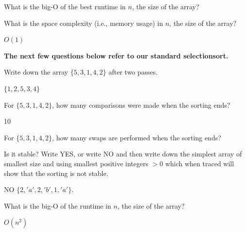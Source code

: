 \nextq
What is the big-O of the best runtime in $n$, the size of the array?
\\
\ANSWER
{}

\nextq
What is the space complexity (i.e., memory usage) in $n$,
the size of the array?
\\
\ANSWER
\begin{answerlong}
$O(1)$
\end{answerlong}

\newpage
\textbf{The next few questions below refer to our standard selectionsort.}

\nextq
Write down the array $\{ 5, 3, 1, 4, 2 \}$ after two passes.
\\
\ANSWER
\begin{answerlong}
$\{ 1, 2, 5, 3, 4 \}$
\end{answerlong}

\nextq
For $\{ 5, 3, 1, 4, 2 \}$, how many comparisons were made when the sorting
ends?
\\
\ANSWER
\begin{answerlong}
10
\end{answerlong}

\nextq
For $\{ 5, 3, 1, 4, 2 \}$, how many swaps are performed when the sorting ends?
\\
\ANSWER
\begin{answerlong}

\end{answerlong}

\nextq
Is it stable?
Write YES, or write NO and then write down the simplest array
of smallest size and using smallest positive integers $> 0$
which when traced will show that the sorting is not stable.
\\
\ANSWER
\begin{answerlong}
NO  $\{{ 2, 'a'}, { 2, 'b'}, { 1, 'a'}\}$.
\end{answerlong}

\nextq
What is the big-O of the runtime in $n$, the size of the array?
\\
\ANSWER
\begin{answerlong}
$O(n^2)$
\end{answerlong}

